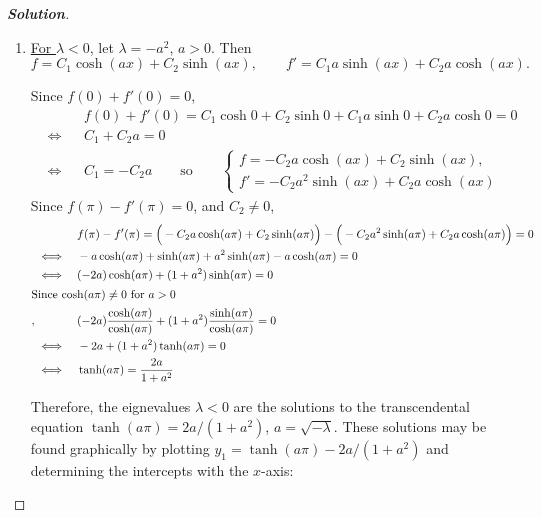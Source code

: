 \documentclass[a4paper,12pt]{article} %
\theoremstyle{plain}
\begin{document}
\begin{proof}[\textbf{Solution}] %
    \begin{enumerate}[label=\alph*.)]
        \item  \underline{For $\lambda < 0$}, let $\lambda = -a^2$, $a>0$. Then \begin{equation*}
        f = C_1 \cosh (a x) + C_2 \sinh (ax), \qquad f' =  C_1 a\sinh (a x) + C_2 a\cosh (ax).
        \end{equation*}
        
        Since $f(0) + f'(0) = 0$,
        \begin{align*}
            &&&f(0) + f'(0) = C_1 \cosh 0 + C_2 \sinh 0 + C_1 a \sinh 0 + C_2 a \cosh 0 = 0\\
            &\iff& &C_1 + C_2 a = 0 \\
            &\iff& &C_1 = -C_2 a  \qquad \text{so}\qquad \begin{cases}
                f=-C_2 a \cosh (ax) + C_2 \sinh(ax),\\
                f'=-C_2 a^2 \sinh(ax) + C_2 a \cosh(ax)
            \end{cases}
        \end{align*}
        Since $f(\pi) -f'(\pi) = 0$, and $C_2 \neq 0$,
        \begin{align*}
            && &f(\pi) - f'(\pi) = \Big(-C_2a \cosh (a\pi) + C_2 \sinh (a\pi)\Big) - \Big(-  C_2a^2\sinh (a \pi) + C_2 a\cosh (a\pi)\Big) =0 \\
            &\iff&& -a \cosh(a\pi) + \sinh(a\pi) + a^2 \sinh(a\pi) - a \cosh(a\pi) = 0\\
            &\iff&& (-2a)\cosh(a\pi) + (1+a^2)\sinh(a\pi) = 0\\
            \intertext{Since $\cosh(a\pi) \neq 0$ for $a>0$},
            &&&(-2a)\frac{\cosh(a\pi)}{\cosh(a\pi)} + (1+a^2)\frac{\sinh(a\pi)}{\cosh(a\pi)} = 0 \\
            &\iff& &-2a+(1+a^2)\tanh(a\pi) = 0 \\
            &\iff&& \tanh (a\pi) = \frac{2a}{1+a^2}
        \end{align*}
        
        Therefore, the eignevalues $\lambda <0$ are the solutions to the transcendental equation $\tanh (a\pi) = 2a/(1+a^2)$, $a=\sqrt{-\lambda}$. These solutions may be found graphically by plotting $y_1 = \tanh (a\pi) - 2a/(1+a^2)$ and determining the intercepts with the $x$-axis:
        \begin{center}
\end{center}
\end{enumerate}
\end{proof}
\end{document}
